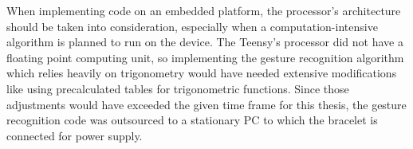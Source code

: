 When implementing code on an embedded platform, the processor's architecture should be taken into consideration, especially when a computation-intensive algorithm is planned to run on the device. The Teensy's processor did not have a floating point computing unit, so implementing the gesture recognition algorithm which relies heavily on trigonometry would have needed extensive modifications like using precalculated tables for trigonometric functions. Since those adjustments would have exceeded the given time frame for this thesis, the gesture recognition code was outsourced to a stationary PC to which the bracelet is connected for power supply.